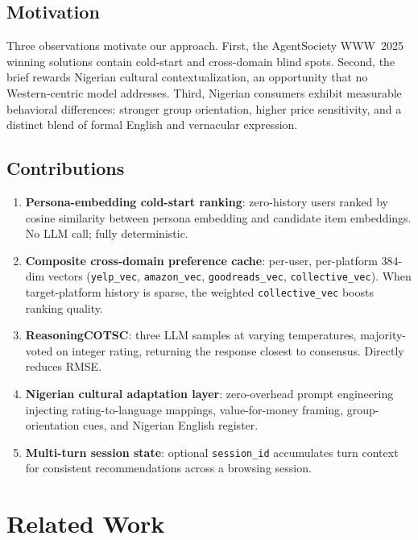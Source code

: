 \documentclass[11pt]{article}
\begin{document}
\subsection{Motivation}

Three observations motivate our approach. First, the AgentSociety WWW~2025 winning solutions contain cold-start and cross-domain blind spots. Second, the brief rewards Nigerian cultural contextualization, an opportunity that no Western-centric model addresses. Third, Nigerian consumers exhibit measurable behavioral differences: stronger group orientation, higher price sensitivity, and a distinct blend of formal English and vernacular expression.

\subsection{Contributions}
\label{sec:contributions}

\begin{enumerate}
  \item \textbf{Persona-embedding cold-start ranking}: zero-history users ranked by cosine similarity between persona embedding and candidate item embeddings. No LLM call; fully deterministic.
  \item \textbf{Composite cross-domain preference cache}: per-user, per-platform 384-dim vectors (\texttt{yelp\_vec}, \texttt{amazon\_vec}, \texttt{goodreads\_vec}, \texttt{collective\_vec}). When target-platform history is sparse, the weighted \texttt{collective\_vec} boosts ranking quality.
  \item \textbf{ReasoningCOTSC}: three LLM samples at varying temperatures, majority-voted on integer rating, returning the response closest to consensus. Directly reduces RMSE.
  \item \textbf{Nigerian cultural adaptation layer}: zero-overhead prompt engineering injecting rating-to-language mappings, value-for-money framing, group-orientation cues, and Nigerian English register.
  \item \textbf{Multi-turn session state}: optional \texttt{session\_id} accumulates turn context for consistent recommendations across a browsing session.
\end{enumerate}

\section{Related Work}
\end{document}
